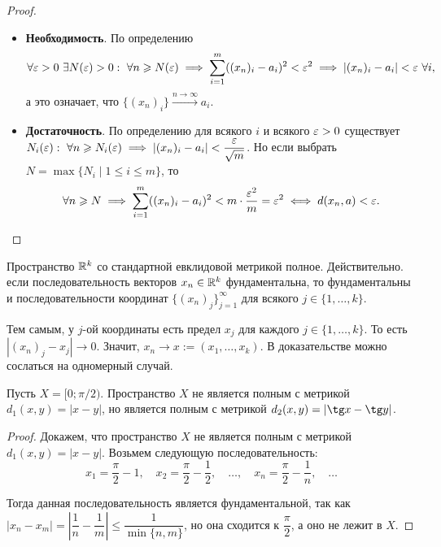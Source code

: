 \documentclass[a4paper]{article}
\theoremstyle{named}
\begin{document}
    \begin{proof}~

        \begin{itemize}
        \item \textbf{Необходимость}. 
            По определению
            \begin{equation*}
                \forall \eps > 0 \ \exists N(\eps) > 0: \ \forall n \geq N(\eps) \implies \sum_{i = 1}^m ((x_n)_i - a_i)^2 < \eps^2 \implies |(x_n)_i - a_i| < \eps \ \forall i,
            \end{equation*}
            а это означает, что $\{(x_n)_i\} \xrightarrow{n \to \infty} a_i$.

        \item \textbf{Достаточность}. 
            По определению для всякого $i$ и всякого $\varepsilon > 0$ существует $N_i(\varepsilon): \ \forall n \geqslant N_i(\varepsilon) \implies |(x_n)_i - a_i| < \dfrac{\varepsilon}{\sqrt{m}}$. Но если выбрать $N = \max \{N_i \mid 1 \leq i \leq m\}$, то
            \begin{equation*}
                \forall n \geqslant N \implies \sum_{i = 1}^m ((x_n)_i - a_i)^2 < m \cdot \dfrac{\varepsilon^2}{m} = \varepsilon^2 \iff d(x_n, a) < \varepsilon.
            \end{equation*}
        \end{itemize}
    \end{proof}

    \begin{example*}
        Пространство $\mathbb{R}^k$ со стандартной евклидовой метрикой полное. Действительно. если последовательность векторов $x_n \in \mathbb{R}^k$ фундаментальна, то фундаментальны и последовательности координат $\{(x_n)_j\}_{j = 1}^{\infty}$ для всякого $j \in \{1, \dots, k\}$.

        Тем самым, у $j$-ой координаты есть предел $x_j$ для каждого $j \in \{1, \dots, k\}$. То есть $|(x_n)_j - x_j| \to 0$. Значит, $x_n \to x := (x_1, \dots, x_k)$. В доказательстве можно сослаться на одномерный случай.
    \end{example*}

    \begin{example*}
        Пусть $X = [0; \pi / 2)$. Пространство $X$ не является полным с метрикой $d_1(x, y) = |x - y|$, но является полным с метрикой $d_2(x, y) = |\tg x - \tg y|$.
    \end{example*}

    \begin{proof}
        Докажем, что пространство $X$ не является полным с метрикой $d_1(x, y) = |x - y|$. Возьмем следующую последовательность:
        \begin{equation*}
            x_1 = \dfrac{\pi}{2} - 1, \quad x_2 = \dfrac{\pi}{2} - \dfrac{1}{2}, \quad \dots, \quad x_n = \dfrac{\pi}{2} - \dfrac{1}{n}, \quad \dots
        \end{equation*}

        Тогда данная последовательность является фундаментальной, так как $|x_n - x_m| = \left|\dfrac{1}{n} - \dfrac{1}{m}\right| \leq \dfrac{1}{\min\{n, m\}}$, но она сходится к $\dfrac{\pi}{2}$, а оно не лежит в $X$.
    \end{proof}
\end{document}
